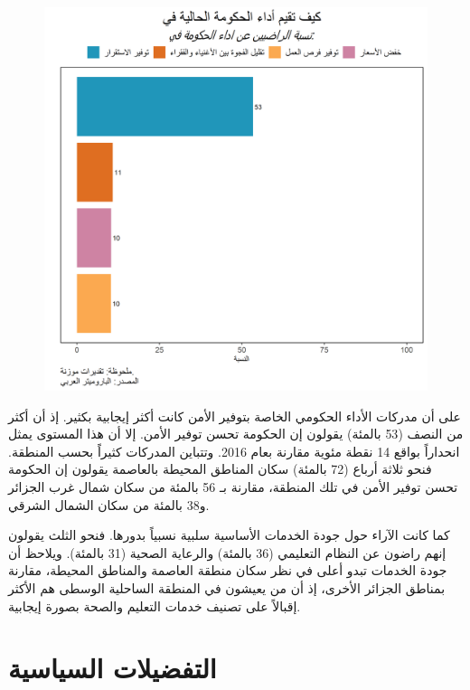 \documentclass{article}
\begin{document}
	\pagebreak
	\begin{center}
		\begin{figure}[H]
			\centering
			\includegraphics[width=13cm]{Q204.png}
		\end{figure}
	\end{center}
	
 على أن مدركات الأداء الحكومي الخاصة بتوفير الأمن كانت أكثر إيجابية بكثير. إذ أن أكثر من النصف (53 بالمئة) يقولون إن الحكومة تحسن توفير الأمن.  إلا أن هذا المستوى يمثل انحداراً بواقع 14 نقطة مئوية مقارنة بعام 2016. وتتباين المدركات كثيراً بحسب المنطقة. فنحو ثلاثة أرباع (72 بالمئة) سكان المناطق المحيطة بالعاصمة يقولون إن الحكومة تحسن توفير الأمن في تلك المنطقة، مقارنة بـ 56 بالمئة من سكان شمال غرب الجزائر و38 بالمئة من سكان الشمال الشرقي.
	
 كما كانت الآراء حول جودة الخدمات الأساسية سلبية نسبياً بدورها. فنحو الثلث يقولون إنهم راضون عن النظام التعليمي (36 بالمئة) والرعاية الصحية (31 بالمئة). ويلاحظ أن جودة الخدمات تبدو أعلى في نظر سكان منطقة العاصمة والمناطق المحيطة، مقارنة بمناطق الجزائر الأخرى، إذ أن من يعيشون في المنطقة الساحلية الوسطى هم الأكثر إقبالاً على تصنيف خدمات التعليم والصحة بصورة إيجابية.
	
\section*{التفضيلات السياسية }
	
\end{document}
